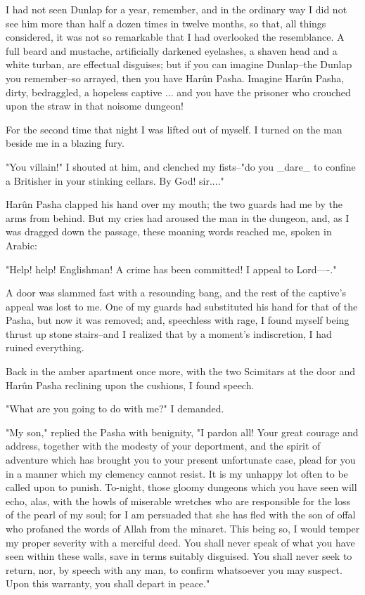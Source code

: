 I had not seen Dunlap for a year, remember, and in the ordinary way
I did not see him more than half a dozen times in twelve months, so
that, all things considered, it was not so remarkable that I had
overlooked the resemblance. A full beard and mustache, artificially
darkened eyelashes, a shaven head and a white turban, are effectual
disguises; but if you can imagine Dunlap--the Dunlap you remember--so
arrayed, then you have Harûn Pasha. Imagine Harûn Pasha, dirty,
bedraggled, a hopeless captive ... and you have the prisoner who
crouched upon the straw in that noisome dungeon!

For the second time that night I was lifted out of myself. I turned
on the man beside me in a blazing fury.

"You villain!" I shouted at him, and clenched my fists--"do you _dare_
to confine a Britisher in your stinking cellars. By God! sir...."

Harûn Pasha clapped his hand over my mouth; the two guards had me by
the arms from behind. But my cries had aroused the man in the dungeon,
and, as I was dragged down the passage, these moaning words reached
me, spoken in Arabic:

"Help! help! Englishman! A crime has been committed! I appeal to
Lord----."

A door was slammed fast with a resounding bang, and the rest of the
captive's appeal was lost to me. One of my guards had substituted his
hand for that of the Pasha, but now it was removed; and, speechless
with rage, I found myself being thrust up stone stairs--and I realized
that by a moment's indiscretion, I had ruined everything.

Back in the amber apartment once more, with the two Scimitars at the
door and Harûn Pasha reclining upon the cushions, I found speech.

"What are you going to do with me?" I demanded.

"My son," replied the Pasha with benignity, "I pardon all! Your great
courage and address, together with the modesty of your deportment, and
the spirit of adventure which has brought you to your present
unfortunate case, plead for you in a manner which my clemency cannot
resist. It is my unhappy lot often to be called upon to punish.
To-night, those gloomy dungeons which you have seen will echo, alas,
with the howls of miserable wretches who are responsible for the loss
of the pearl of my soul; for I am persuaded that she has fled with the
son of offal who profaned the words of Allah from the minaret. This
being so, I would temper my proper severity with a merciful deed. You
shall never speak of what you have seen within these walls, save in
terms suitably disguised. You shall never seek to return, nor, by
speech with any man, to confirm whatsoever you may suspect. Upon this
warranty, you shall depart in peace."

